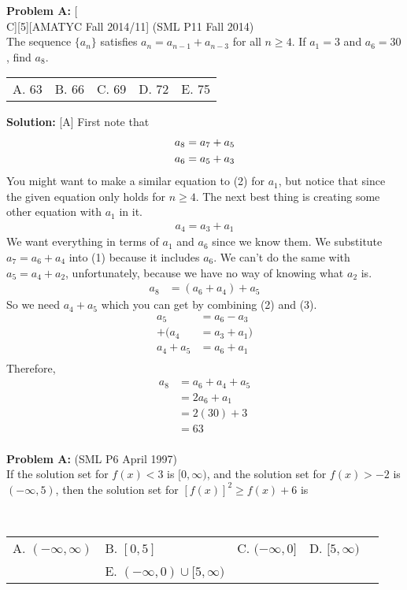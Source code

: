 \documentclass[12pt]{article}
\makeatletter
\newcounter{problem}
\newenvironment{problem}[1]{%
    \stepcounter{problem}
    \noindent\textbf{Problem A\theproblem:} #1
    \\[1em]
}{}
\newcommand{\multChoice}[5]{%
    \begin{tabular}{l @{\hskip 1.5cm} l @{\hskip 1.5cm} l @{\hskip 1.5cm} l @{\hskip 1.5cm} l}
    A. #1 & B. #2 & C. #3 & D. #4 & E. #5
    \end{tabular}
}
\newenvironment{solution}{%
    \vspace{1em}
    \noindent\textbf{Solution:} 
}{}
\makeatother
\begin{document}
\vskip 1cm

\begin{problem}[C][5][AMATYC Fall 2014/11]
    (SML P11 Fall 2014) \\
    The sequence \(\{a_n\}\) satisfies \(a_n = a_{n-1} + a_{n-3}\) for all \(n \geq 4\). If \(a_1 = 3\) and \(a_6 = 30\), find \(a_8\).
    \multChoice{63}{66}{69}{72}{75}
   \end{problem}


\begin{solution}[A]
   First note that
   \begin{align} \setcounter{equation}{0}
       a_8 &= a_7 + a_5\\
       a_6 &= a_5 + a_3
   \end{align}
   You might want to make a similar equation to (2) for $a_1$, but notice that since the given equation only holds for $n \geq 4$. The next best thing is creating some other equation with $a_1$ in it.
   \begin{align}
       a_4=a_3+a_1
   \end{align}
   We want everything in terms of $a_1$ and $a_6$ since we know them. We substitute $a_7=a_6+a_4$ into (1) because it includes $a_6$. We can't do the same with $a_5=a_4+a_2$, unfortunately, because we have no way of knowing what $a_2$ is.
   \begin{align}
       a_8 &= (a_6 + a_4) + a_5
   \end{align}
   So we need $a_4 + a_5$ which you can get by combining (2) and (3).
   \begin{align*}
       a_5 &= a_6 - a_3\\
       +(a_4 &= a_3 + a_1)\\
       a_4 + a_5 &= a_6 + a_1\\
   \end{align*}
   Therefore,
   \begin{align*}
       a_8 &= a_6 + a_4 + a_5\\
       &= 2a_6 + a_1\\
       &=2(30)+3\\
       &=\boxed{63}\\
   \end{align*}
\end{solution}

\problem{ (SML P6 April 1997) \\
    If the solution set for $f(x) < 3$ is $[0,\infty)$, and the solution set for $f(x) > -2$ is $(-\infty, 5)$, then the solution set for $[f(x)]^2 \geq f(x) + 6$ is
}
\multChoice{$(-\infty,\infty)$}{$[0,5]$}{$(-\infty,0]$}{$[5,\infty)$ \\}
{$(-\infty,0) \cup [5,\infty)$}
\end{document}
